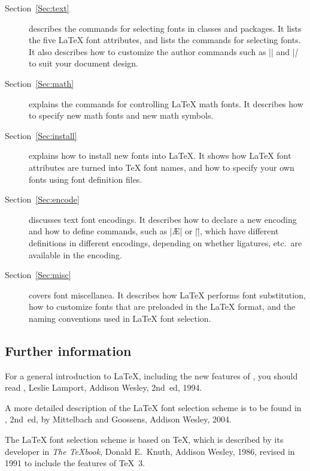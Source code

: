 \documentclass{ltxguide}[1995/11/28]
\begin{document}
\begin{description}

\item[Section~\ref{Sec:text}] describes the commands for selecting fonts
  in classes and packages.  It lists the five \LaTeX{} font attributes,
  and lists the commands for selecting fonts.  It also describes how to
  customize the author commands such as |\textrm| and |\textit| to suit
  your document design.

\item[Section~\ref{Sec:math}] explains the commands for controlling
  \LaTeX{} math fonts.  It describes how to specify new math fonts and
  new math symbols.

\item[Section~\ref{Sec:install}] explains how to install new fonts into
  \LaTeX.  It shows how \LaTeX{} font attributes are turned into \TeX{}
  font names, and how to specify your own fonts using font definition
  files.

\item[Section~\ref{Sec:encode}] discusses text font encodings.  It
  describes how to declare a new encoding and how to define commands,
  such as |\AE| or |\"|, which have different definitions in different
  encodings, depending on whether ligatures, etc.\ are available in the
  encoding.

\item[Section~\ref{Sec:misc}] covers font miscellanea.  It describes how
  \LaTeX{} performs font substitution, how to customize fonts that are
  preloaded in the \LaTeX{} format, and the naming conventions used in
  \LaTeX{} font selection.

\end{description}

\subsection{Further information}

For a general introduction to \LaTeX, including the new features of
\LaTeXe, you should read \emph{\LaTeXbook}, Leslie Lamport, Addison
Wesley, 2nd~ed, 1994.

A more detailed description of the \LaTeX{} font selection scheme is to
be found in \emph{\LaTeXcomp}, 2nd~ed, by Mittelbach and Goossens,
Addison Wesley, 2004.

The \LaTeX{} font selection scheme is based on \TeX, which is described
by its developer in \emph{The \TeX book}, Donald E.~Knuth, Addison
Wesley, 1986, revised in 1991 to include the features of \TeX~3.
\end{document}

